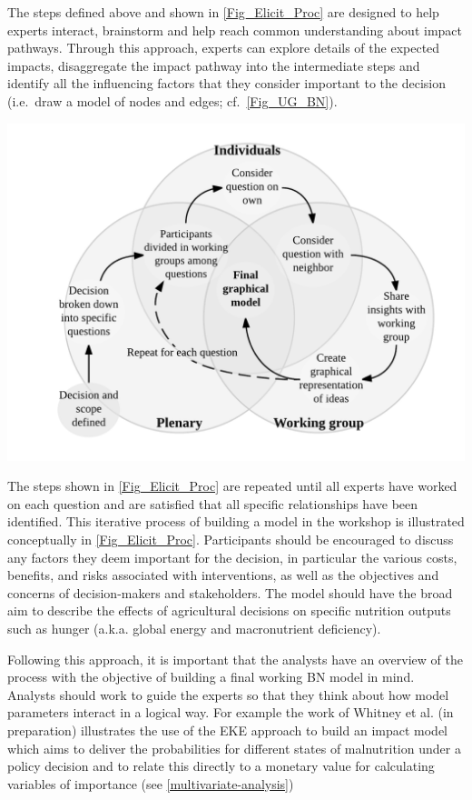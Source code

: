 \documentclass[
]{article}
\let\origfigure\figure
\let\endorigfigure\endfigure
\renewenvironment{figure}[1][2] {
    \expandafter\origfigure\expandafter[H]
} {
    \endorigfigure
}
\begin{document}
The steps defined above and shown in \autoref{Fig_Elicit_Proc} are
designed to help experts interact, brainstorm and help reach common
understanding about impact pathways. Through this approach, experts can
explore details of the expected impacts, disaggregate the impact pathway
into the intermediate steps and identify all the influencing factors
that they consider important to the decision (i.e.~draw a model of nodes
and edges; cf.~\autoref{Fig_UG_BN}).

\begin{figure}
\centering
\includegraphics{Fig_Elicit_Proc.png}
\caption{Process used for eliciting graphical representations of
decisions from expert groups to be used in developing a
BN\label{Fig_Elicit_Proc}}
\end{figure}

The steps shown in \autoref{Fig_Elicit_Proc} are repeated until all
experts have worked on each question and are satisfied that all specific
relationships have been identified. This iterative process of building a
model in the workshop is illustrated conceptually in
\autoref{Fig_Elicit_Proc}. Participants should be encouraged to discuss
any factors they deem important for the decision, in particular the
various costs, benefits, and risks associated with interventions, as
well as the objectives and concerns of decision-makers and stakeholders.
The model should have the broad aim to describe the effects of
agricultural decisions on specific nutrition outputs such as hunger
(a.k.a. global energy and macronutrient deficiency).

Following this approach, it is important that the analysts have an
overview of the process with the objective of building a final working
BN model in mind. Analysts should work to guide the experts so that they
think about how model parameters interact in a logical way. For example
the work of Whitney et al. (in preparation) illustrates the use of the
EKE approach to build an impact model which aims to deliver the
probabilities for different states of malnutrition under a policy
decision and to relate this directly to a monetary value for calculating
variables of importance (see \autoref{multivariate-analysis})
\end{document}
